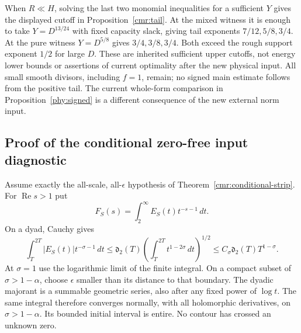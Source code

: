 When $R\ll H$, solving the last two monomial inequalities for a
sufficient $Y$ gives the displayed cutoff in Proposition~\ref{cmr:tail}.
At the mixed witness it is enough to take $Y=D^{13/24}$ with fixed
capacity slack, giving tail exponents $7/12,5/8,3/4$.
At the pure witness $Y=D^{5/8}$ gives $3/4,3/8,3/4$.
Both exceed the rough support exponent $1/2$ for large $D$.
These are inherited sufficient upper cutoffs, not energy lower bounds
or assertions of current optimality after the new physical input.
All small smooth divisors, including $f=1$, remain; no signed main
estimate follows from the positive tail. The current whole-form
comparison in Proposition~\ref{phy:signed} is a different consequence of the
new external norm input.

\subsection{Proof of the conditional zero-free input diagnostic}
\label{cmr:strip-proof}
Assume exactly the all-scale, all-$\epsilon$ hypothesis of
Theorem~\ref{cmr:conditional-strip}. For $\operatorname{Re}s>1$ put
\[
 F_S(s)=\int_2^\infty E_S(t)t^{-s-1}\,dt.
\]
On a dyad, Cauchy gives
\[
 \int_T^{2T}|E_S(t)|t^{-\sigma-1}\,dt
 \le\mathfrak d_2(T)
       \left(\int_T^{2T}t^{1-2\sigma}\,dt\right)^{1/2}
 \le C_\sigma\mathfrak d_2(T)T^{1-\sigma}.
\]
At $\sigma=1$ use the logarithmic limit of the finite integral.
On a compact subset of $\sigma>1-\alpha$, choose $\epsilon$ smaller
than its distance to that boundary. The dyadic majorant is a
summable geometric series, also after any fixed power of $\log t$.
The same integral therefore converges normally, with all holomorphic
derivatives, on $\sigma>1-\alpha$. Its bounded initial interval is
entire. No contour has crossed an unknown zero.

